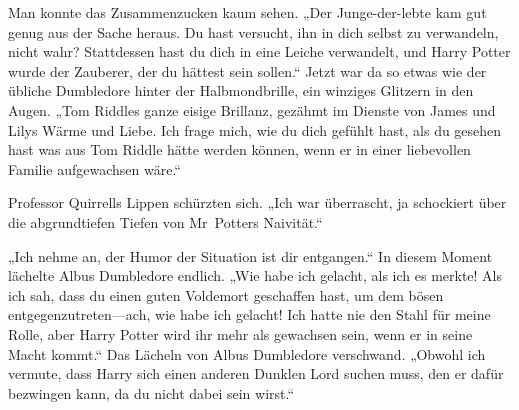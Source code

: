 Man konnte das Zusammenzucken kaum sehen.
„Der Junge-der-lebte kam gut genug aus der Sache heraus. Du hast versucht, ihn in dich selbst zu verwandeln, nicht wahr? Stattdessen hast du dich in eine Leiche verwandelt, und Harry Potter wurde der Zauberer, der du hättest sein sollen.“
Jetzt war da so etwas wie der übliche Dumbledore hinter der Halbmondbrille, ein winziges Glitzern in den Augen.
„Tom Riddles ganze eisige Brillanz, gezähmt im Dienste von James und Lilys Wärme und Liebe. Ich frage mich, wie du dich gefühlt hast, als du gesehen hast was aus Tom Riddle hätte werden können, wenn er in einer liebevollen Familie aufgewachsen wäre.“

Professor Quirrells Lippen schürzten sich.
„Ich war überrascht, ja schockiert über die abgrundtiefen Tiefen von Mr~Potters Naivität.“

„Ich nehme an, der Humor der Situation ist dir entgangen.“
In diesem Moment lächelte Albus Dumbledore endlich.
„Wie habe ich gelacht, als ich es merkte! Als ich sah, dass du einen guten Voldemort geschaffen hast, um dem bösen entgegenzutreten—ach, wie habe ich gelacht! Ich hatte nie den Stahl für meine Rolle, aber Harry Potter wird ihr mehr als gewachsen sein, wenn er in seine Macht kommt.“
Das Lächeln von Albus Dumbledore verschwand.
„Obwohl ich vermute, dass Harry sich einen anderen Dunklen Lord suchen muss, den er dafür bezwingen kann, da du nicht dabei sein wirst.“

